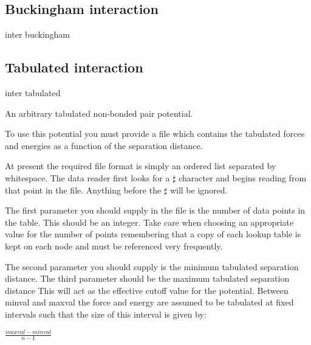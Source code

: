 \subsection{Buckingham interaction}

\begin{essyntax}
  inter   buckingham
      
    
\end{essyntax}

\subsection{Tabulated interaction}

\begin{essyntax}
  inter   tabulated %
  \begin{features}
  \end{features}
\end{essyntax}

An arbitrary tabulated non-bonded pair potential.

To use this potential you must provide a file which contains the
tabulated forces and energies as a function of the separation
distance.

At present the required file format is simply an ordered list
separated by whitespace. The data reader first looks for a $\sharp$
character and begins reading from that point in the file. Anything
before the $\sharp$ will be ignored.

The first parameter you should supply in the file is the number of
data points in the table. This should be an integer. Take care when
choosing an appropriate value for the number of points remembering
that a copy of each lookup table is kept on each node and must be
referenced very frequently.

The second parameter you should supply is the minimum tabulated
separation distance. The third parameter should be the maximum
tabulated separation distance This will act as the effective cutoff
value for the potential. Between minval and maxval the force and
energy are assumed to be tabulated at fixed intervals such that the
size of this interval is given by:

$\frac{maxval-minval}{n-1}$

